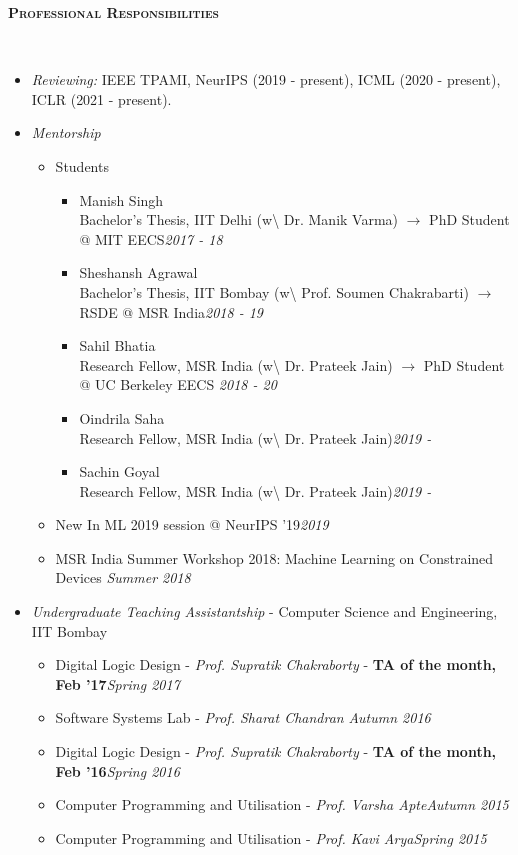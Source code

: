 \documentclass[10pt]{article}
\renewcommand{\section}[1]{
\bigskip
  \begin{Large}
  {\textsc{\textbf{#1}}}
  \end{Large}
  \hrulefill
  \medskip
  \\
}
\newenvironment{lonemidlist}[1][\enskip\textbullet]%
        {\begin{itemize}[#1,leftmargin=*,parsep=0pt,itemsep=4pt,topsep=0pt,partopsep=0pt]}
        {\end{itemize}\vspace{-.6\baselineskip}}
\begin{document}
\section{Professional Responsibilities}
\vspace{-3mm}
\begin{lonemidlist}
\item \emph{Reviewing:} IEEE TPAMI, NeurIPS ({2019 - present}), ICML ({2020 - present}), ICLR ({2021 - present}).

\item \emph{Mentorship}
\begin{itemize}
    \item Students
        \begin{itemize}
            \item Manish Singh\\Bachelor's Thesis, IIT Delhi (w\textbackslash{} Dr. Manik Varma) $\to$ PhD Student @ MIT EECS\hfill\textit{2017 - 18}
            \item Sheshansh Agrawal\\Bachelor's Thesis, IIT Bombay (w\textbackslash{} Prof. Soumen Chakrabarti) $\to$ RSDE @ MSR India\hfill\textit{2018 - 19}
            \item Sahil Bhatia\\Research Fellow, MSR India (w\textbackslash{} Dr. Prateek Jain) $\to$ PhD Student @ UC Berkeley EECS \hfill\textit{2018 - 20}
            \item Oindrila Saha\\Research Fellow, MSR India (w\textbackslash{} Dr. Prateek Jain)\hfill\textit{2019 -}
            \item Sachin Goyal\\Research Fellow, MSR India (w\textbackslash{} Dr. Prateek Jain)\hfill\textit{2019 -}
        \end{itemize}
    \item New In ML 2019 session @ NeurIPS '19\hfill \textit{2019}
    \item MSR India Summer Workshop 2018: Machine Learning on Constrained Devices \hfill \textit{Summer 2018}
\end{itemize}

\item \textit{Undergraduate Teaching Assistantship} - Computer Science and Engineering, IIT Bombay
  
  \begin{itemize}
        \item Digital Logic Design - \textit{Prof. Supratik Chakraborty} - \textbf{TA of the month, Feb '17}\hfill{\textit{Spring 2017}}
        \item Software Systems Lab - \textit{Prof. Sharat Chandran} \hfill{\textit{Autumn 2016}}
        \item Digital Logic Design - \textit{Prof. Supratik Chakraborty} - \textbf{TA of the month, Feb '16}\hfill{\textit{Spring 2016}}
        \item Computer Programming and Utilisation - \textit{Prof. Varsha Apte}\hfill{\textit{Autumn 2015}}
        \item Computer Programming and Utilisation - \textit{Prof. Kavi Arya}\hfill{\textit{Spring 2015}}
           

\end{itemize}
\end{lonemidlist}
\end{document}
